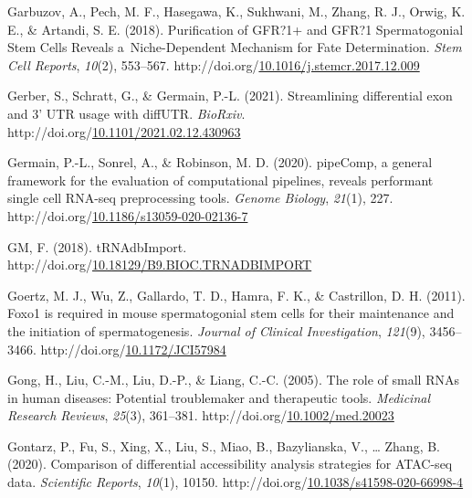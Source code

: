 \documentclass[12pt,twoside]{reedthesis}
\newlength{\cslhangindent}
\newenvironment{CSLReferences}[2] %
 {%
  \setlength{\parindent}{0pt}
  \ifodd #1 \everypar{\setlength{\hangindent}{\cslhangindent}}\ignorespaces\fi
  \ifnum #2 > 0
  \setlength{\parskip}{#2\baselineskip}
  \fi
 }%
 {}
\begin{document}
\begin{CSLReferences}{1}{0}
\leavevmode{}%
Garbuzov, A., Pech, M. F., Hasegawa, K., Sukhwani, M., Zhang, R. J., Orwig, K. E., \& Artandi, S. E. (2018). Purification of GFR?1+ and GFR?1{\textendash} Spermatogonial Stem Cells Reveals a~Niche-Dependent Mechanism for Fate Determination. \emph{Stem Cell Reports}, \emph{10}(2), 553--567. http://doi.org/\href{https://doi.org/10.1016/j.stemcr.2017.12.009}{10.1016/j.stemcr.2017.12.009}

\leavevmode{}%
Gerber, S., Schratt, G., \& Germain, P.-L. (2021). Streamlining differential exon and 3' UTR usage with diffUTR. \emph{BioRxiv}. http://doi.org/\href{https://doi.org/10.1101/2021.02.12.430963}{10.1101/2021.02.12.430963}

\leavevmode{}%
Germain, P.-L., Sonrel, A., \& Robinson, M. D. (2020). pipeComp, a general framework for the evaluation of computational pipelines, reveals performant single cell RNA-seq preprocessing tools. \emph{Genome Biology}, \emph{21}(1), 227. http://doi.org/\href{https://doi.org/10.1186/s13059-020-02136-7}{10.1186/s13059-020-02136-7}

\leavevmode{}%
GM, F. (2018). tRNAdbImport. http://doi.org/\href{https://doi.org/10.18129/B9.BIOC.TRNADBIMPORT}{10.18129/B9.BIOC.TRNADBIMPORT}

\leavevmode{}%
Goertz, M. J., Wu, Z., Gallardo, T. D., Hamra, F. K., \& Castrillon, D. H. (2011). Foxo1 is required in mouse spermatogonial stem cells for their maintenance and the initiation of spermatogenesis. \emph{Journal of Clinical Investigation}, \emph{121}(9), 3456--3466. http://doi.org/\href{https://doi.org/10.1172/JCI57984}{10.1172/JCI57984}

\leavevmode{}%
Gong, H., Liu, C.-M., Liu, D.-P., \& Liang, C.-C. (2005). The role of small RNAs in human diseases: Potential troublemaker and therapeutic tools. \emph{Medicinal Research Reviews}, \emph{25}(3), 361--381. http://doi.org/\href{https://doi.org/10.1002/med.20023}{10.1002/med.20023}

\leavevmode{}%
Gontarz, P., Fu, S., Xing, X., Liu, S., Miao, B., Bazylianska, V., \ldots{} Zhang, B. (2020). Comparison of differential accessibility analysis strategies for ATAC-seq data. \emph{Scientific Reports}, \emph{10}(1), 10150. http://doi.org/\href{https://doi.org/10.1038/s41598-020-66998-4}{10.1038/s41598-020-66998-4}


\end{CSLReferences}
\end{document}
